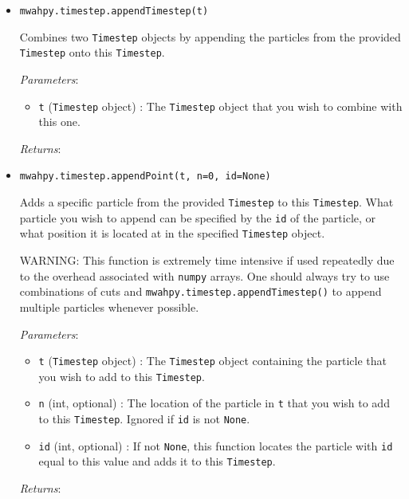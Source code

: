 \documentclass{article}
\begin{document}
\begin{itemize}



\item \verb!mwahpy.timestep.appendTimestep(t)!

Combines two \verb!Timestep! objects by appending the particles from the provided \verb!Timestep! onto this \verb!Timestep!.

\textit{Parameters}: \begin{itemize}

\item \verb!t! (\verb!Timestep! object) : The \verb!Timestep! object that you wish to combine with this one.

\end{itemize}

\textit{Returns}:



\item \verb!mwahpy.timestep.appendPoint(t, n=0, id=None)!

Adds a specific particle from the provided \verb!Timestep! to this \verb!Timestep!. What particle you wish to append can be specified by the \verb!id! of the particle, or what position it is located at in the specified \verb!Timestep! object.

WARNING: This function is extremely time intensive if used repeatedly due to the overhead associated with \verb!numpy! arrays. One should always try to use combinations of cuts and \verb!mwahpy.timestep.appendTimestep()! to append multiple particles whenever possible.

\textit{Parameters}: \begin{itemize}

\item \verb!t! (\verb!Timestep! object) : The \verb!Timestep! object containing the particle that you wish to add to this \verb!Timestep!.

\item \verb!n! (int, optional) : The location of the particle in \verb!t! that you wish to add to this \verb!Timestep!. Ignored if \verb!id! is not \verb!None!.

\item \verb!id! (int, optional) : If not \verb!None!, this function locates the particle with \verb!id! equal to this value and adds it to this \verb!Timestep!.

\end{itemize}

\textit{Returns}:




\end{itemize}
\end{document}
